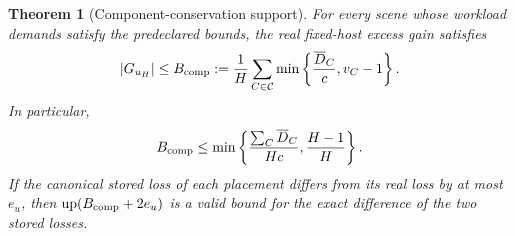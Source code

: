 \documentclass[11pt]{article}
\newtheorem{theorem}{Theorem}
\begin{document}
\begin{theorem}[Component-conservation support]\label{thm:component-conservation}
For every scene whose workload demands satisfy the predeclared bounds, the real fixed-host excess gain satisfies
\begin{equation}\label{eq:component-conservation-bound}
|G_{u_H}|\le B_{\rm comp}:=\frac1H\sum_{C\in\mathcal C}\min\left\{\frac{\overline D_C}{c},v_C-1\right\}.
\end{equation}
In particular,
\begin{equation}\label{eq:component-conservation-dominates}
B_{\rm comp}\le\min\left\{\frac{\sum_C\overline D_C}{Hc},\frac{H-1}{H}\right\}.
\end{equation}
If the canonical stored loss of each placement differs from its real loss by at most $e_u$, then $\operatorname{up}(B_{\rm comp}+2e_u)$ is a valid bound for the exact difference of the two stored losses.
\end{theorem}
\end{document}
